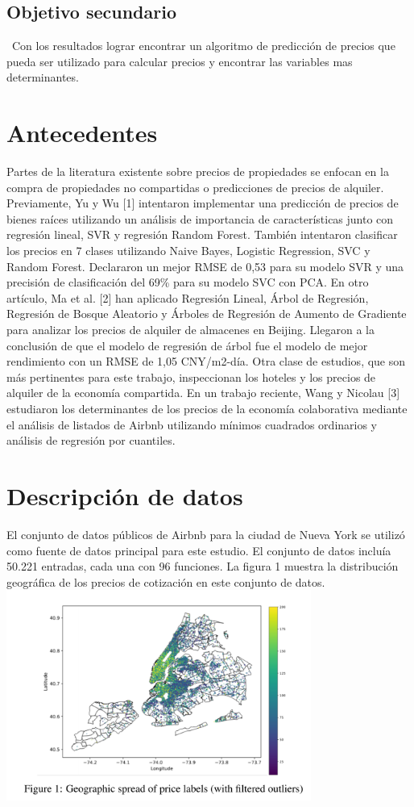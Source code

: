 \documentclass[conference]{IEEEtran}
\begin{document}
\subsection{Objetivo secundario}
 Con los resultados lograr encontrar un algoritmo de predicción de precios que pueda ser utilizado para calcular precios y encontrar las variables mas determinantes.

\section{Antecedentes}
Partes de la literatura existente sobre precios de propiedades se enfocan en la compra de propiedades no compartidas o predicciones de precios de alquiler. Previamente, Yu y Wu [1] intentaron implementar una predicción de precios de bienes raíces utilizando un análisis de importancia de características junto con regresión lineal, SVR y regresión Random Forest. También intentaron clasificar los precios en 7 clases utilizando Naive Bayes, Logistic Regression, SVC y Random Forest. Declararon un mejor RMSE de 0,53 para su modelo SVR y una precisión de clasificación del 69\% para su modelo SVC con PCA. En otro artículo, Ma et al. [2] han aplicado Regresión Lineal, Árbol de Regresión, Regresión de Bosque Aleatorio y Árboles de Regresión de Aumento de Gradiente para analizar los precios de alquiler de almacenes en Beijing. Llegaron a la conclusión de que el modelo de regresión de árbol fue el modelo de mejor rendimiento con un RMSE de 1,05 CNY/m2-día. Otra clase de estudios, que son más pertinentes para este trabajo, inspeccionan los hoteles y los precios de alquiler de la economía compartida. En un trabajo reciente, Wang y Nicolau [3] estudiaron los determinantes de los precios de la economía colaborativa mediante el análisis de listados de Airbnb utilizando mínimos cuadrados ordinarios y análisis de regresión por cuantiles.

\section{Descripción de datos}
El conjunto de datos públicos de Airbnb para la ciudad de Nueva York se utilizó como fuente de datos principal para este estudio. El conjunto de datos incluía 50.221 entradas, cada una con 96 funciones. La figura 1 muestra la distribución geográfica de los precios de cotización en este conjunto de datos.
\includegraphics[width=10cm]{images/figura1.png}
\end{document}
